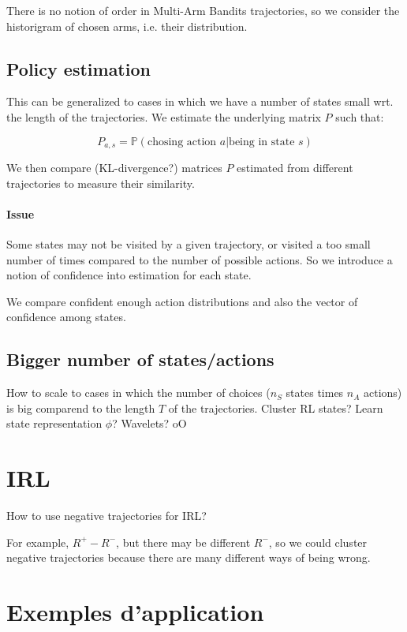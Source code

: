 \documentclass{article}
\begin{document}
There is no notion of order in Multi-Arm Bandits trajectories, so we consider the historigram of chosen arms, i.e. their distribution.

\subsection{Policy estimation}

This can be generalized to cases in which we have a number of states small wrt. the length of the trajectories. We estimate the underlying matrix $P$ such that:

\[
P_{a,s} = \mathbb P(\text{chosing action } a | \text{being in state } s)
\]

We then compare (KL-divergence?) matrices $P$ estimated from different trajectories to measure their similarity.

\paragraph{Issue} Some states may not be visited by a given trajectory, or visited a too small number of times compared to the number of possible actions. So we introduce a notion of confidence into estimation for each state.

We compare confident enough action distributions and also the vector of confidence among states.

\subsection{Bigger number of states/actions}

How to scale to cases in which the number of choices ($n_S$ states times $n_A$ actions) is big comparend to the length $T$ of the trajectories. Cluster RL states? Learn state representation $\phi$? Wavelets? oO

\section{IRL}

How to use negative trajectories for IRL?

For example, $R^+ - R^-$, but there may be different $R^-$, so we could cluster negative trajectories because there are many different ways of being wrong.

\section{Exemples d'application}
\end{document}
